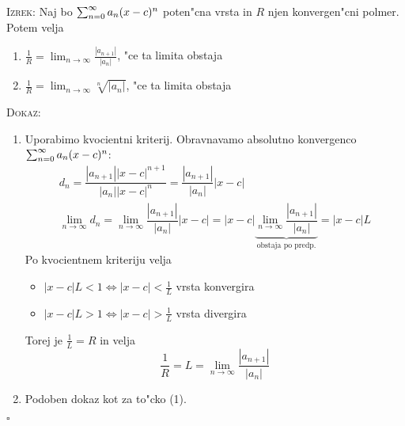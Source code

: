 \textsc{Izrek:} Naj bo $\sum_{n = 0}^{\infty} a_n (x - c)^n$ poten"cna vrsta in $R$ njen konvergen"cni polmer. Potem velja
\begin{enumerate}
    \item $\frac{1}{R} = \lim_{n \to \infty} \frac{|a_{n+1}|}{|a_n|}$, "ce ta limita obstaja
    \item $\frac{1}{R} = \lim_{n \to \infty} \sqrt[n]{|a_n|}$, "ce ta limita obstaja
\end{enumerate}
\textsc{Dokaz:}
\begin{enumerate}
    \item Uporabimo kvocientni kriterij. Obravnavamo absolutno konvergenco $\sum_{n = 0}^{\infty} a_n (x - c)^n$:
    \begin{gather*}
    d_n = \dfrac{|a_{n+1}| |x-c|^{n+1}}{|a_n| |x-c|^n} = \dfrac{|a_{n+1}|}{|a_n|} |x-c| \\
    \lim_{n \to \infty} d_n = \lim_{n \to \infty} \dfrac{|a_{n+1}|}{|a_n|} |x-c| = |x-c| \underbrace{\lim_{n \to \infty} \dfrac{|a_{n+1}|}{|a_n|}}_\text{obstaja po predp.} = |x-c| L
    \end{gather*}
    Po kvocientnem kriteriju velja
    \begin{itemize}
        \item $|x - c| L < 1 \iff | x - c| < \frac{1}{L}$ vrsta konvergira
        \item $|x - c| L > 1 \iff |x - c| > \frac{1}{L}$ vrsta divergira
    \end{itemize}
    Torej je $\frac{1}{L} = R$ in velja
    \begin{equation*}
    \dfrac{1}{R} = L = \lim_{n \to \infty} \dfrac{|a_{n+1}|}{|a_n|}
    \end{equation*}
    
    \item Podoben dokaz kot za to"cko (1).
\end{enumerate}
\hfill $\square$

